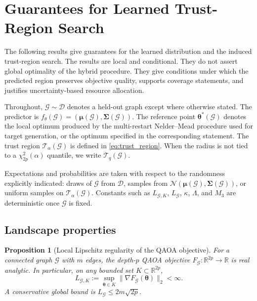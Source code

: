 \documentclass[aps,prx,reprint,superscriptaddress,longbibliography]{revtex4-2}
\newcommand{\QAOA}{\textnormal{\textsc{QAOA}}}
\newcommand{\Normal}{\mathcal{N}}
\newcommand{\calG}{\mathcal{G}}
\newcommand{\calD}{\mathcal{D}}
\newcommand{\calT}{\mathcal{T}}
\newcommand{\bbR}{\mathbb{R}}
\newtheorem{proposition}[theorem]{Proposition}
\begin{document}
\section{Guarantees for Learned Trust-Region Search}
\label{sec:theory}

The following results give guarantees for the learned distribution and
the induced trust-region search. The results are local and conditional. They do not
assert global optimality of the hybrid procedure. They give
conditions under which the predicted region preserves objective
quality, supports coverage statements, and justifies uncertainty-based
resource allocation.

Throughout, $\calG \sim \calD$ denotes a held-out graph except where
otherwise stated. The predictor is
$f_\theta(\calG) = (\bm\mu(\calG),\bm\Sigma(\calG))$.
The reference point $\bm\theta^*(\calG)$ denotes the local optimum
produced by the multi-restart Nelder--Mead procedure used for target
generation, or the optimum specified in the corresponding statement.
The trust region $\calT_\alpha(\calG)$ is defined in
\cref{eq:trust_region}. When the radius is not tied to a
$\chi^2_{2p}(\alpha)$ quantile, we write $\calT_q(\calG)$.

Expectations and probabilities are taken with respect to the randomness
explicitly indicated: draws of $\calG$ from $\calD$, samples from
$\Normal(\bm\mu(\calG),\bm\Sigma(\calG))$, or uniform samples on
$\calT_\alpha(\calG)$. Constants such as $L_{\calG,K}$, $L_\calG$,
$\kappa$, $\Lambda$, and $M_3$ are deterministic once $\calG$ is fixed.

\subsection{Landscape properties}

\begin{proposition}[Local Lipschitz regularity of the \QAOA{} objective]
\label{prop:lipschitz}
For a connected graph $\calG$ with $m$ edges, the depth-$p$ \QAOA{}
objective $F_\calG : \bbR^{2p} \to \bbR$ is real analytic. In
particular, on any bounded set $K \subset \bbR^{2p}$,
\begin{equation}
    L_{\calG,K} := \sup_{\bm\theta \in K}
    \|\nabla F_\calG(\bm\theta)\|_2 < \infty.
    \label{eq:local_lipschitz_def}
\end{equation}
A conservative global bound is $L_\calG \le 2m\sqrt{2p}$.
\end{proposition}
\end{document}
